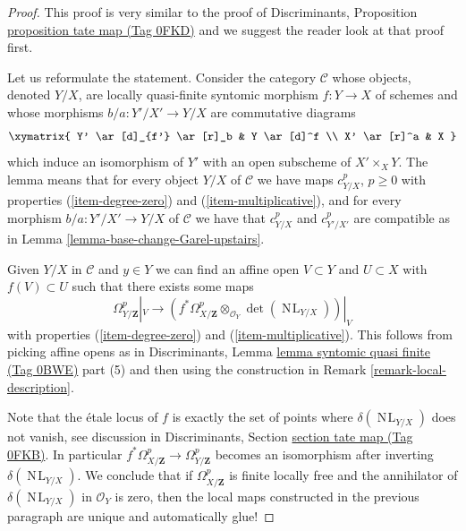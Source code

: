 \documentclass{amsart}
\theoremstyle{plain}
\theoremstyle{definition}
\theoremstyle{remark}
\numberwithin{equation}{subsection}
\def\NL{\mathop{N\!L}\nolimits}
\begin{document}
\begin{proof}
This proof is very similar to the proof of
Discriminants, Proposition \href{https://stacks.math.columbia.edu/tag/0FKD}{proposition tate map (Tag 0FKD)}
and we suggest the reader look at that proof first.

\medskip\noindent
Let us reformulate the statement. Consider the category
$\mathcal{C}$ whose objects, denoted $Y/X$, are locally quasi-finite syntomic
morphism $f : Y \to X$ of schemes and whose morphisms
$b/a : Y'/X' \to Y/X$ are commutative diagrams
$$
\xymatrix{
Y' \ar[d]_{f'} \ar[r]_b & Y \ar[d]^f \\
X' \ar[r]^a & X
}
$$
which induce an isomorphism of $Y'$ with an open subscheme of
$X' \times_X Y$. The lemma means that for every object
$Y/X$ of $\mathcal{C}$ we have maps $c^p_{Y/X}$, $p \geq 0$
with properties (\ref{item-degree-zero}) and (\ref{item-multiplicative}),
and for every morphism $b/a : Y'/X' \to Y/X$ of $\mathcal{C}$ we have
that $c^p_{Y/X}$ and $c^p_{Y'/X'}$ are compatible as in
Lemma \ref{lemma-base-change-Garel-upstairs}.

\medskip\noindent
Given $Y/X$ in $\mathcal{C}$ and $y \in Y$ we can find
an affine open $V \subset Y$ and $U \subset X$ with $f(V) \subset U$
such that there exists some maps
$$
\Omega^p_{Y/\mathbf{Z}}|_V
\longrightarrow
\left(
f^*\Omega^p_{X/\mathbf{Z}} \otimes_{\mathcal{O}_Y} \det(\NL_{Y/X})
\right)|_V
$$
with properties (\ref{item-degree-zero}) and (\ref{item-multiplicative}).
This follows from picking affine opens as in
Discriminants, Lemma \href{https://stacks.math.columbia.edu/tag/0BWE}{lemma syntomic quasi finite (Tag 0BWE)} part (5)
and then using the construction in Remark \ref{remark-local-description}.

\medskip\noindent
Note that the \'etale locus of $f$ is exactly the set of points where
$\delta(\NL_{Y/X})$ does not vanish, see discussion in
Discriminants, Section \href{https://stacks.math.columbia.edu/tag/0FKB}{section tate map (Tag 0FKB)}.
In particular
$f^*\Omega^p_{X/\mathbf{Z}} \to \Omega^p_{Y/\mathbf{Z}}$
becomes an isomorphism after inverting $\delta(\NL_{Y/X})$.
We conclude that if $\Omega^p_{X/\mathbf{Z}}$ is finite locally free and
the annihilator of $\delta(\NL_{Y/X})$ in $\mathcal{O}_Y$ is zero, then
the local maps constructed in the previous paragraph
are unique and automatically glue!


\end{proof}
\end{document}
